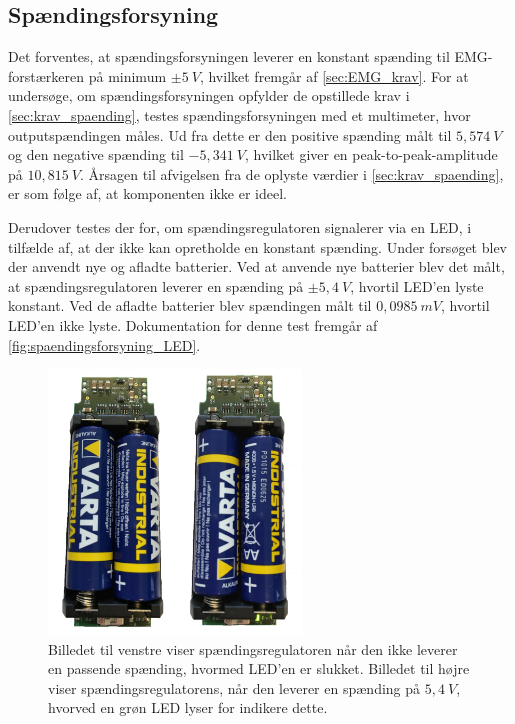\subsection{Spændingsforsyning} \label{test_spaendingsforsyning}
Det forventes, at spændingsforsyningen leverer en konstant spænding til EMG-forstærkeren på minimum $\pm 5~V$, hvilket fremgår af \autoref{sec:EMG_krav}. 
For at undersøge, om spændingsforsyningen opfylder de opstillede krav i \autoref{sec:krav_spaending}, testes spændingsforsyningen med et multimeter, hvor outputspændingen måles. %
Ud fra dette er den positive spænding målt til $5,574~V$ og den negative spænding til $-5,341~V$, hvilket giver en peak-to-peak-amplitude på $10,815~V$. 
Årsagen til afvigelsen fra de oplyste værdier i \autoref{sec:krav_spaending}, er som følge af, at komponenten ikke er ideel. 

%
Derudover testes der for, om spændingsregulatoren signalerer via en LED, i tilfælde af, at der ikke kan opretholde en konstant spænding. 
Under forsøget blev der anvendt nye og afladte batterier. 
Ved at anvende nye batterier blev det målt, at spændingsregulatoren leverer en spænding på $\pm5,4~V$, hvortil LED'en lyste konstant. 
Ved de afladte batterier blev spændingen målt til $0,0985~mV$, hvortil LED'en ikke lyste. Dokumentation for denne test fremgår af \autoref{fig:spaendingsforsyning_LED}.


\begin{figure}[H]
\centering
\includegraphics[width=0.6\textwidth]{figures/bat_test}
\caption{Billedet til venstre viser spændingsregulatoren når den ikke leverer en passende spænding, hvormed LED'en er slukket. Billedet til højre viser spændingsregulatorens, når den leverer en spænding på $5,4~V$, hvorved en grøn LED lyser for indikere dette.}
\label{fig:spaendingsforsyning_LED}
\end{figure}

